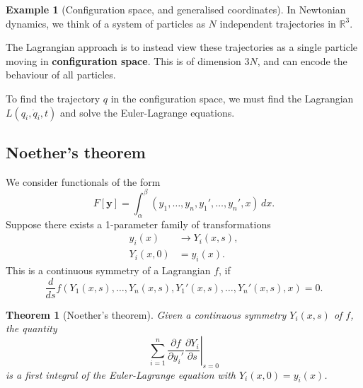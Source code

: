 \documentclass[12pt]{article}
\newtheorem{theorem}{Theorem}[section]
\theoremstyle{definition}
\newtheorem{example}{Example}[section]
\theoremstyle{remark}
\begin{document}
\begin{adjustbox}{minipage = \columnwidth - 25.5pt, margin=1em, frame=1pt, margin=0em}
	\begin{example}[Configuration space, and generalised coordinates]
		In Newtonian dynamics, we think of a system of particles as $N$ independent trajectories in $\mathbb{R}^3$.

		The Lagrangian approach is to instead view these trajectories as a single particle moving in \textbf{configuration space}. This is of dimension $3N$, and can encode the behaviour of all particles.

		To find the trajectory $q$ in the configuration space, we must find the Lagrangian $L(q_i, \dot q_i, t)$ and solve the Euler-Lagrange equations.
\end{example}

\end{adjustbox}

\subsection{Noether's theorem}%
\label{sub:noether_s_theorem}

We consider functionals of the form
\[
	F[\mathbf{y}] = \int_{\alpha}^{\beta} (y_1, \ldots, y_n, y_1', \ldots, y_n', x) \, dx
.\]
Suppose there exists a 1-parameter family of transformations
\begin{align*}
	y_i(x) &\to Y_i(x, s), \\
	Y_i(x, 0) &= y_i(x).
\end{align*}
This is a continuous symmetry of a Lagrangian $f$, if
\[
	\frac{d}{ds} f(Y_1(x, s), \ldots, Y_n(x, s), Y_1'(x, s), \ldots, Y_n'(x, s), x) = 0
.\]

\begin{theorem}[Noether's theorem]
	Given a continuous symmetry $Y_i(x, s)$ of $f$, the quantity
	\[
		\sum_{i = 1}^{n} \left. \frac{\partial f}{\partial y_i'} \frac{\partial Y_i}{\partial s} \right|_{s = 0} \tag{4.3}\label{eq:nt}
	\]
	is a first integral of the Euler-Lagrange equation with $Y_i(x, 0) = y_i(x)$.
\end{theorem}
\end{document}

